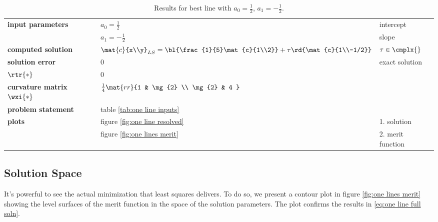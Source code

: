  \begin{table}[t]  %
    \caption{Results for best line with $a_{0} = \frac{1}{2}$, $a_{1} = -\frac{1}{2}$.}
    \begin{center}
      \begin{tabular}{lll}
        \bf{input parameters} & $a_{0} =  \frac{1}{2}$ & intercept \\
                              & $a_{1} = -\frac{1}{2}$ & slope \\
        \bf{computed solution} & $\mat{c}{x\\y}_{LS} = \bl{\frac{1}{5}\mat{c}{1\\2}} + \tau \rd{\mat{c}{1\\-1/2}}$ & $\tau \in \cmplx{}$\\
        \bf{solution error} & 0 & exact solution \\
        \bf{$\rtr{*}$} & $0$ \\
        \bf{curvature matrix $\wxi{*}$} & $\frac{1}{4}\mat{rr}{1 & \mg{2} \\ \mg{2} & 4 }$\\[5pt]
        \bf{problem statement} & table \ref{tab:one line inputs} \\
        \bf{plots}             & figure \ref{fig:one line resolved} & 1. solution\\
           & figure \ref{fig:one lines merit} & 2. merit function \\
      \end{tabular}
    \end{center}
  \label{tab:one line solution}
  \end{table}%

\subsection{Solution Space}  %
It's powerful to see the actual minimization that least squares delivers. To do so, we present a contour plot in figure \ref{fig:one lines merit} showing the level surfaces of the merit function in the space of the solution parameters. The plot confirms the results in \eqref{eq:one line full soln}. 


